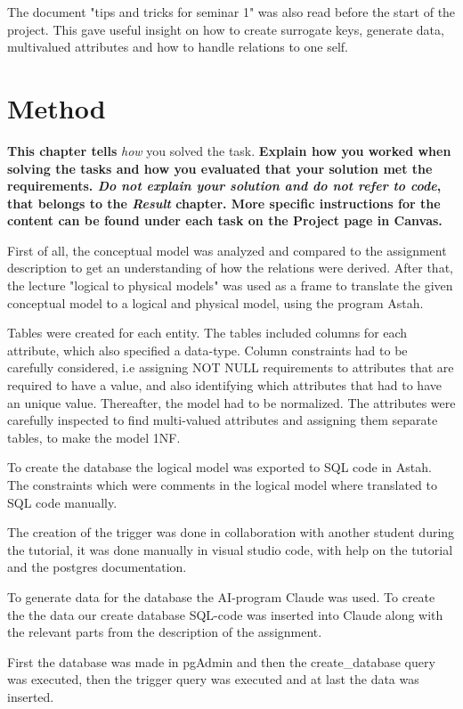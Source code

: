 \documentclass[a4paper]{scrartcl}
\begin{document}
The document "tips and tricks for seminar 1" was also read before the start of the project. This gave useful insight on how to create surrogate keys, generate data, multivalued attributes and how to handle relations to one self.  

\section{Method}

\textbf{This chapter tells} \textit{how} you solved the task.
\textbf{
Explain how you worked when solving the tasks and how you evaluated that your solution met the requirements. \textit{Do not explain your solution and do not refer to code}, that belongs to the \textit{Result} chapter. More specific instructions for the content can be found under each task on the Project page in Canvas.}

First of all, the conceptual model was analyzed and compared to the assignment description to get an understanding of how the relations were derived. After that, the lecture "logical to physical models" was used as a frame to translate the given conceptual model to a logical and physical model, using the program Astah. 

Tables were created for each entity. The tables included columns for each attribute, which also specified a data-type.  Column constraints had to be carefully considered, i.e assigning NOT NULL requirements to attributes that are required to have a value, and also identifying which attributes that had to have an unique value. Thereafter, the model had to be normalized. The attributes were carefully inspected to find multi-valued attributes and assigning them separate tables, to make the model 1NF.

To create the database the logical model was exported to SQL code in Astah. The constraints which were comments in the logical model where translated to SQL code manually.

The creation of the trigger was done in collaboration with another student during the tutorial, it was done manually in visual studio code, with help on the tutorial and the postgres documentation. 

To generate data for the database the AI-program Claude was used. To create the the data our create database SQL-code was inserted into Claude along with the relevant parts from the description of the assignment. 

First the database was made in pgAdmin and then the create\_database query was executed, then the trigger query was executed and at last the data was inserted.
\end{document}
